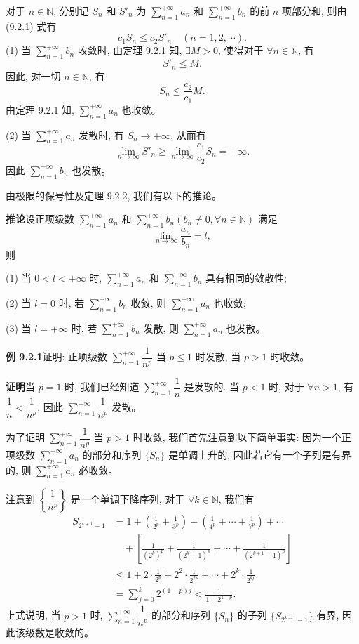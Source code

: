 \documentclass[UTF8,12pt,a4paper,fontset=fandol]{ctexart}
\begin{document}
对于 $n\in\mathbb N$, 分别记 $S_n$ 和 $S'_n$ 为 $\sum\limits_{n=1}^{+\infty}a_n$ 和 $\sum\limits_{n=1}^{+\infty}b_n$ 的前 $n$ 项部分和, 则由 (9.2.1) 式有
\[
  c_1S_n\leq c_2S'_n\quad(n=1,2,\cdots).
\]
(1) 当 $\sum\limits_{n=1}^{+\infty}b_n$ 收敛时, 由定理 9.2.1 知, $\exists M>0$, 使得对于 $\forall n\in\mathbb N$, 有
\[
  S'_n\leq M.
\]
因此, 对一切 $n\in\mathbb N$, 有
\[
  S_n\leq\frac{c_2}{c_1}M.
\]
由定理 9.2.1 知, $\sum\limits_{n=1}^{+\infty}a_n$ 也收敛。

(2) 当 $\sum\limits_{n=1}^{+\infty}a_n$ 发散时, 有 $S_n\to+\infty$, 从而有
\[
  \lim_{n\to\infty}S'_n\geq\lim_{n\to\infty}\frac{c_1}{c_2}S_n=+\infty.
\]
因此 $\sum\limits_{n=1}^{+\infty}b_n$ 也发散。

由极限的保号性及定理 9.2.2, 我们有以下的推论。

\noindent\textbf{推论}\quad 设正项级数 $\sum\limits_{n=1}^{+\infty}a_n$ 和 $\sum\limits_{n=1}^{+\infty}b_n(b_n\neq0,\forall n\in\mathbb N)$ 满足
\[
  \lim_{n\to\infty}\frac{a_n}{b_n}=l,
\]
则

(1) 当 $0<l<+\infty$ 时, $\sum\limits_{n=1}^{+\infty}a_n$ 和 $\sum\limits_{n=1}^{+\infty}b_n$ 具有相同的敛散性;

(2) 当 $l=0$ 时, 若 $\sum\limits_{n=1}^{+\infty}b_n$ 收敛, 则 $\sum\limits_{n=1}^{+\infty}a_n$ 也收敛;

(3) 当 $l=+\infty$ 时, 若 $\sum\limits_{n=1}^{+\infty}b_n$ 发散, 则 $\sum\limits_{n=1}^{+\infty}a_n$ 也发散。

\noindent\textbf{例 9.2.1}\quad 证明: 正项级数 $\sum\limits_{n=1}^{+\infty}\dfrac1{n^p}$ 当 $p\leq1$ 时发散, 当 $p>1$ 时收敛。

\noindent\textbf{证明}\quad 当 $p=1$ 时, 我们已经知道 $\sum\limits_{n=1}^{+\infty}\dfrac1n$ 是发散的. 当 $p<1$ 时, 对于 $\forall n>1$, 有 $\dfrac1n<\dfrac1{n^p}$, 因此 $\sum\limits_{n=1}^{+\infty}\dfrac1{n^p}$ 发散。

为了证明 $\sum\limits_{n=1}^{+\infty}\dfrac1{n^p}$ 当 $p>1$ 时收敛, 我们首先注意到以下简单事实: 因为一个正项级数 $\sum\limits_{n=1}^{+\infty}a_n$ 的部分和序列 $\{S_n\}$ 是单调上升的, 因此若它有一个子列是有界的, 则 $\sum\limits_{n=1}^{+\infty}a_n$ 必收敛。

注意到 $\left\{\dfrac1{n^p}\right\}$ 是一个单调下降序列, 对于 $\forall k\in\mathbb N$, 我们有
\[
\begin{aligned}
  S_{2^{k+1}-1}
  &=1+\left(\frac1{2^p}+\frac1{3^p}\right)
    +\left(\frac1{4^p}+\cdots+\frac1{7^p}\right)+\cdots\\
  &\quad+\left[\frac1{(2^k)^p}+\frac1{(2^k+1)^p}+\cdots+\frac1{(2^{k+1}-1)^p}\right]\\
  &\leq1+2\cdot\frac1{2^p}+2^2\cdot\frac1{2^{2p}}+\cdots+2^k\cdot\frac1{2^{kp}}\\
  &=\sum_{j=0}^k2^{(1-p)j}<\frac1{1-2^{1-p}}.
\end{aligned}
\]
上式说明, 当 $p>1$ 时, $\sum\limits_{n=1}^{+\infty}\dfrac1{n^p}$ 的部分和序列 $\{S_n\}$ 的子列 $\{S_{2^{k+1}-1}\}$ 有界, 因此该级数是收敛的。
\end{document}

